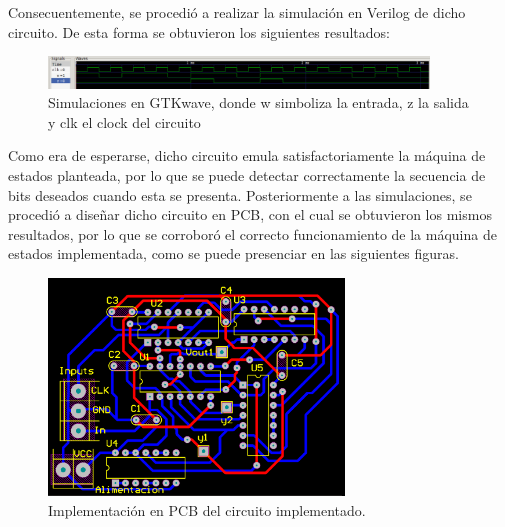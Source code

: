 Consecuentemente, se procedió a realizar la simulación en Verilog de dicho circuito. De esta forma se obtuvieron los siguientes resultados:
\begin{figure}[H]
\centering
\includegraphics[width=0.9\textwidth]{ImagenesEjercicio2/simulacion.png}
\caption{Simulaciones en GTKwave, donde w simboliza la entrada, z la salida y clk el clock del circuito}
\end{figure}

Como era de esperarse, dicho circuito emula satisfactoriamente la máquina de estados planteada, por lo que se puede detectar correctamente la secuencia de bits deseados cuando esta se presenta. Posteriormente a las simulaciones, se procedió a diseñar dicho circuito en PCB, con el cual se obtuvieron los mismos resultados, por lo que se corroboró el correcto funcionamiento de la máquina de estados implementada, como se puede presenciar en las siguientes figuras.
\begin{figure}[H]
\centering
\includegraphics[width=0.7\textwidth]{ImagenesEjercicio2/pcb.png}
\caption{Implementación en PCB del circuito implementado.}
\end{figure}

